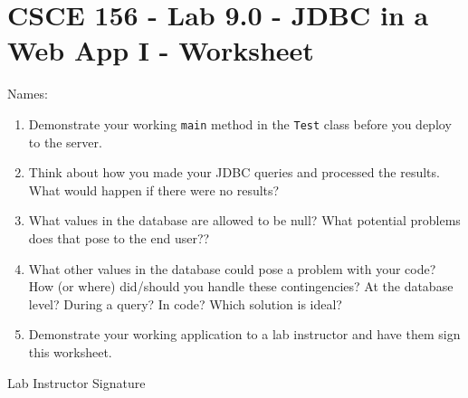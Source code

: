 \documentclass[12pt]{scrartcl}
\begin{document}
\section*{CSCE 156 - Lab 9.0 - JDBC in a Web App I - Worksheet}

Names: \underline{\hspace{10cm}}

\begin{enumerate}

  \item Demonstrate your working \texttt{main} method 
  in the \texttt{Test} class before you deploy to the server.

  \item Think about how you made your JDBC queries and processed 
  the results.  What would happen if there were no results?  

  \item What values in the database are allowed to be null?  What 
  potential problems does that pose to the end user??
  \item What other values in the database could pose a problem 
  with your code?  How (or where) did/should you handle these 
  contingencies?  At the database level?  During a query?  
  In code?  Which solution is ideal?

  \item Demonstrate your working application to a lab instructor 
  and have them sign this worksheet.

\end{enumerate}

Lab Instructor Signature\underline{\hspace{7.5cm}}
\end{document}
